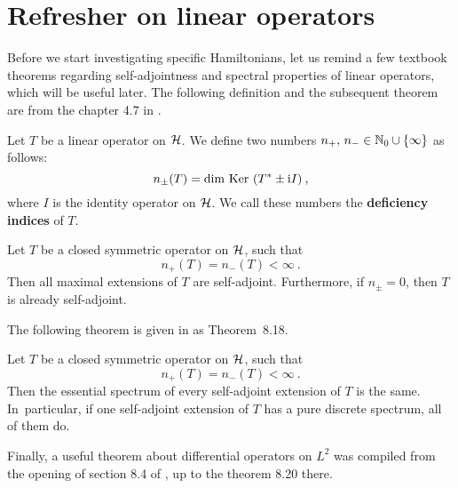 \section{Refresher on linear operators}
Before we start investigating specific Hamiltonians, let us remind a few textbook theorems regarding self-adjointness and spectral properties of linear operators, which will be useful later. The following definition and the subsequent theorem are from the chapter 4.7 in \cite{BEH}.
\begin{defn}
    \label{defn-deficiency-indices}
    Let $T$ be a linear operator on $\mathcal{H}$. We define two numbers $n_+, \, n_- \in \mathbb{N}_0 \cup \{ \infty \}$ as follows:
    \begin{equation*}
        n_\pm(T) = \mathrm{dim~Ker~} (T^* \pm \mathrm{i} I) \: ,
    \end{equation*}
    where $I$ is the identity operator on $\mathcal{H}$. We call these numbers the \textbf{deficiency indices} of $T$.
\end{defn}
\begin{thm}
    \label{thm-deficiency-self-adj}
    Let $T$ be a closed symmetric operator on $\mathcal{H}$, such that
    \begin{equation*}
        n_+(T) = n_-(T) < \infty \: .
    \end{equation*}
    Then all maximal extensions of $T$ are self-adjoint. Furthermore, if $n_\pm = 0$, then $T$ is already self-adjoint.
\end{thm}
The following theorem is given in \cite{Weidmann} as Theorem~8.18.
\begin{thm}
    \label{thm-sym-extension-spectrum}
    Let $T$ be a closed symmetric operator on $\mathcal{H}$, such that
    \begin{equation*}
        n_+(T) = n_-(T) < \infty \: .
    \end{equation*}
    Then the essential spectrum of every self-adjoint extension of $T$ is the same. In~particular, if one self-adjoint extension of $T$ has a pure discrete spectrum, all of them do.
\end{thm}
Finally, a useful theorem about differential operators on $L^2$ was compiled from the opening of section 8.4 of \cite{Weidmann}, up to the theorem 8.20 there.

